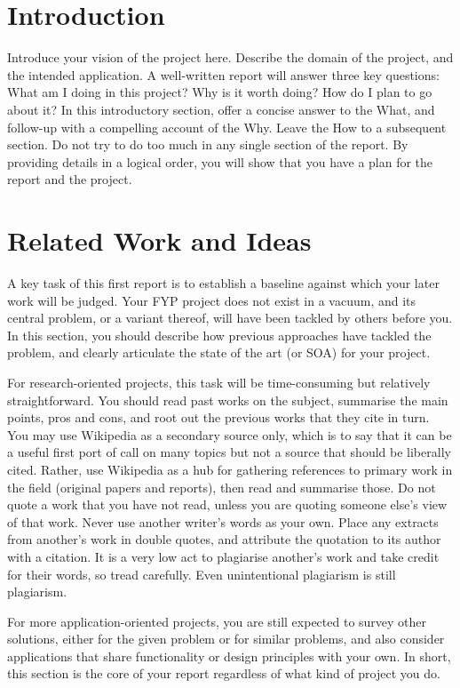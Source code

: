\documentclass[]{UCD_CS_FYP_Report}
\begin{document}
\chapter{Introduction}
Introduce your vision of the project here. Describe the domain of the project, and the intended application. A well-written report will answer three key questions: What am I doing in this project? Why is it worth doing? How do I plan to go about it? In this introductory section, offer a concise answer to the What, and follow-up with a compelling account of the Why. Leave the How to a subsequent section. Do not try to do too much in any single section of the report. By providing details in a logical order, you will show that you have a plan for the report and the project.  

\chapter{Related Work and Ideas}
A key task of this first report is to establish a baseline against which your later work will be judged. Your FYP project does not exist in a vacuum, and its central problem, or a variant thereof, will have been tackled by others before you. In this section, you should describe how previous approaches have tackled the problem, and clearly articulate the state of the art (or SOA) for your project.

For research-oriented projects, this task will be time-consuming but relatively straightforward. You should read past works on the subject, summarise the main points, pros and cons, and root out the previous works that they cite in turn. You may use Wikipedia as a secondary source only, which is to say that it can be a useful first port of call on many topics but not a source that should be liberally cited. Rather, use Wikipedia as a hub for gathering references to primary work in the field (original papers and reports), then read and summarise those. Do not quote a work that you have not read, unless you are quoting someone else’s view of that work. Never use another writer’s words as your own. Place any extracts from another’s work in double quotes, and attribute the quotation to its author with a citation. It is a very low act to plagiarise another’s work and take credit for their words, so tread carefully. Even unintentional plagiarism is still plagiarism.

For more application-oriented projects, you are still expected to survey other solutions, either for the given problem or for similar problems, and also consider applications that share functionality or design principles with your own. In short, this section is the core of your report regardless of what kind of project you do.
\end{document}
